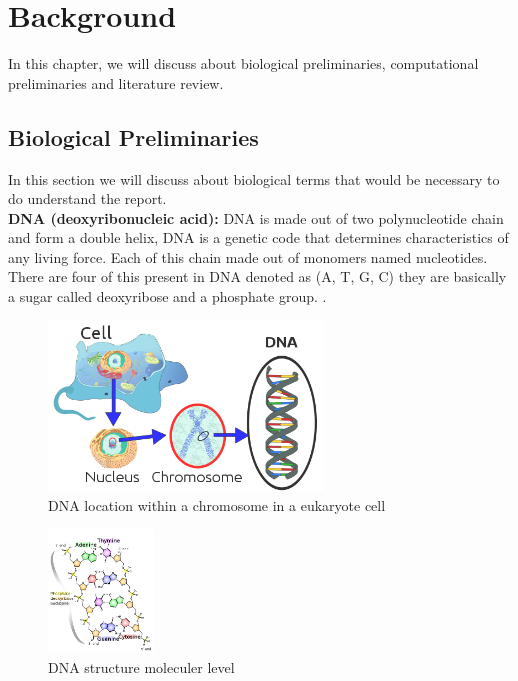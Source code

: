 \chapter{Background}
In this chapter, we will discuss about biological preliminaries, computational preliminaries and literature review.
\section{Biological Preliminaries}
\label{bio_pre}
In this section we will discuss about biological terms that would be necessary to do understand the report. \\[10pt]

\textbf{DNA (deoxyribonucleic acid):} DNA is made out of two polynucleotide chain and form a double helix, DNA is a genetic code that determines characteristics of any living force. Each of this chain made out of monomers named nucleotides. There are four of this present in DNA denoted as (A, T, G, C) they are basically a sugar called deoxyribose and a phosphate group.  \cite{wiki:DNA}. \\[5pt]

\begin{figure}[H]
    \centering
    \includegraphics[width=0.65\textwidth]{DNA-cell.png}
    \caption{DNA location within a chromosome in a eukaryote cell   }
    \label{fig:dnafig}
\end{figure}

\begin{figure}[H]
    \centering
    \includegraphics[width=0.25\textwidth]{dna}
    \caption{DNA structure moleculer level  }
    \label{fig:dnafig}
\end{figure}
 
